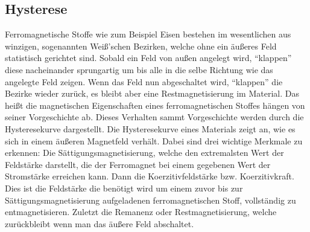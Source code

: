 \subsection{Hysterese}
Ferromagnetische Stoffe wie zum Beispiel Eisen bestehen im wesentlichen aus
winzigen, sogenannten Weiß'schen Bezirken, welche ohne ein äußeres Feld
statistisch gerichtet sind. Sobald ein Feld von außen angelegt wird,
\enquote{klappen} diese nacheinander sprungartig um bis alle in die selbe
Richtung wie das angelegte Feld zeigen. Wenn das Feld nun abgeschaltet wird, \enquote{klappen} die
Bezirke wieder zurück, es bleibt aber eine Restmagnetisierung im Material.
Das heißt die magnetischen Eigenschaften eines ferromagnetischen Stoffes hängen
von seiner Vorgeschichte ab.
Dieses Verhalten sammt Vorgeschichte werden durch die Hysteresekurve
dargestellt.
Die Hysteresekurve eines Materials zeigt an, wie es sich in einem äußeren
Magnetfeld verhält.
Dabei sind drei wichtige Merkmale zu erkennen:
Die Sättigungsmagnetisierung, welche den extremalsten Wert der Feldstärke
darstellt, die der Ferromagnet bei einem gegebenen Wert der Stromstärke
erreichen kann.
Dann die Koerzitivfeldstärke bzw. Koerzitivkraft. Dies ist die Feldstärke die
benötigt wird um einem zuvor bis zur Sättigungsmagnetisierung aufgeladenen
ferromagnetischen Stoff, vollständig zu entmagnetisieren.
Zuletzt die Remanenz oder Restmagnetisierung, welche zurückbleibt wenn man das
äußere Feld abschaltet\cite{Anleitung}.
